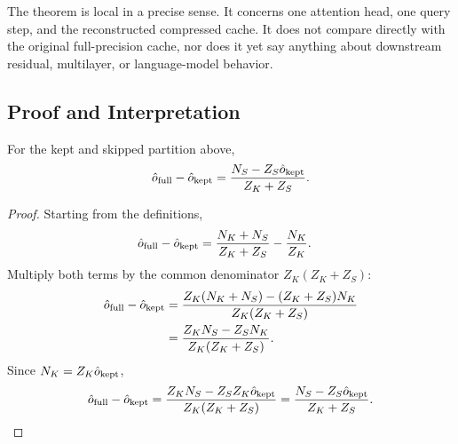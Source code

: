 The theorem is local in a precise sense. It concerns one attention head, one query step, and the reconstructed compressed cache. It does not compare directly with the original full-precision cache, nor does it yet say anything about downstream residual, multilayer, or language-model behavior.

\subsection{Proof and Interpretation}

\begin{proposition}
  \label{prop:identity}
  For the kept and skipped partition above,
  \begin{equation}
    \hat{o}_{\mathrm{full}} - \hat{o}_{\mathrm{kept}}
    =
    \frac{N_S - Z_S \hat{o}_{\mathrm{kept}}}{Z_K + Z_S}.
  \end{equation}
\end{proposition}

\begin{proof}
  Starting from the definitions,
  \begin{align}
    \hat{o}_{\mathrm{full}} - \hat{o}_{\mathrm{kept}}
    &=
    \frac{N_K + N_S}{Z_K + Z_S}
    -
    \frac{N_K}{Z_K}.
  \end{align}
  Multiply both terms by the common denominator \(Z_K(Z_K+Z_S)\):
  \begin{align}
    \hat{o}_{\mathrm{full}} - \hat{o}_{\mathrm{kept}}
    &=
    \frac{Z_K(N_K + N_S) - (Z_K + Z_S)N_K}{Z_K(Z_K + Z_S)}
    \\
    &=
    \frac{Z_KN_S - Z_SN_K}{Z_K(Z_K + Z_S)}.
  \end{align}
  Since \(N_K = Z_K \hat{o}_{\mathrm{kept}}\),
  \begin{equation}
    \hat{o}_{\mathrm{full}} - \hat{o}_{\mathrm{kept}}
    =
    \frac{Z_KN_S - Z_SZ_K\hat{o}_{\mathrm{kept}}}{Z_K(Z_K + Z_S)}
    =
    \frac{N_S - Z_S\hat{o}_{\mathrm{kept}}}{Z_K + Z_S}.
  \end{equation}
\end{proof}

